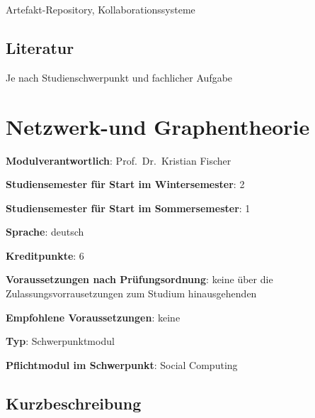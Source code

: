 Artefakt-Repository, Kollaborationssysteme

\section*{Literatur\label{/mi-2017/modulbeschreibungen-master/MA_Modul_Projekt_Vision&Konzept}}\label{literaturpathlabelmi-2017modulbeschreibungen-mastermaux5fmodulux5fprojektux5fvisionkonzept}

Je nach Studienschwerpunkt und fachlicher Aufgabe

\chapter{Netzwerk-und
Graphentheorie\label{/mi-2017/modulbeschreibungen-master/MA_SC_Modul_Netzwerk--und-Graphentheorie}}\label{netzwerk-und-graphentheoriepathlabelmi-2017modulbeschreibungen-mastermaux5fscux5fmodulux5fnetzwerkund-graphentheorie}

\begin{modulHead}
\textbf{Modulverantwortlich}: Prof.~Dr.~Kristian
Fischer
\end{modulHead}
\begin{modulHead}
\textbf{Studiensemester für
Start im Wintersemester}:
2
\end{modulHead}
\begin{modulHead}
\textbf{Studiensemester für Start
im Sommersemester}:
1
\end{modulHead}
\begin{modulHead}
\textbf{Sprache}:
deutsch
\end{modulHead}
\begin{modulHead}
\textbf{Kreditpunkte}:
6
\end{modulHead}
\begin{modulHead}
\textbf{Voraussetzungen nach
Prüfungsordnung}: keine über die Zulassungsvorrausetzungen zum Studium
hinausgehenden
\end{modulHead}
\begin{modulHead}
\textbf{Empfohlene
Voraussetzungen}: keine
\end{modulHead}
\begin{modulHead}
\textbf{Typ}:
Schwerpunktmodul
\end{modulHead}
\begin{modulHead}
\textbf{Pflichtmodul
im Schwerpunkt}: Social Computing
\end{modulHead}


\section*{Kurzbeschreibung\label{/mi-2017/modulbeschreibungen-master/MA_SC_Modul_Netzwerk--und-Graphentheorie}}\label{kurzbeschreibungpathlabelmi-2017modulbeschreibungen-mastermaux5fscux5fmodulux5fnetzwerkund-graphentheorie}

